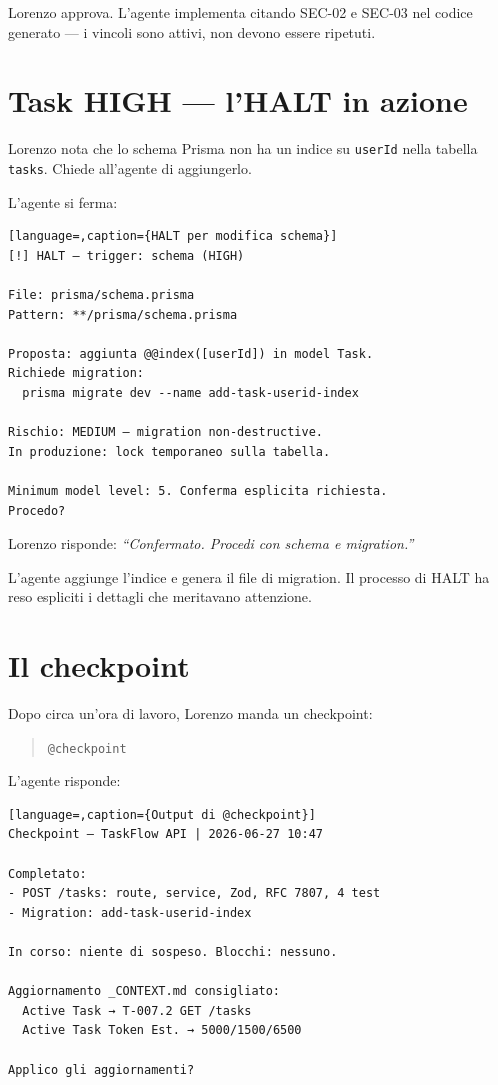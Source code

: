 Lorenzo approva. L'agente implementa citando SEC-02 e SEC-03 nel codice generato --- i vincoli sono attivi, non devono essere ripetuti.

\section{Task HIGH --- l'HALT in azione}
\label{sec:03-task-high}

Lorenzo nota che lo schema Prisma non ha un indice su \texttt{userId} nella tabella \texttt{tasks}. Chiede all'agente di aggiungerlo.

L'agente si ferma:

\begin{lstlisting}[language=,caption={HALT per modifica schema}]
[!] HALT — trigger: schema (HIGH)

File: prisma/schema.prisma
Pattern: **/prisma/schema.prisma

Proposta: aggiunta @@index([userId]) in model Task.
Richiede migration:
  prisma migrate dev --name add-task-userid-index

Rischio: MEDIUM — migration non-destructive.
In produzione: lock temporaneo sulla tabella.

Minimum model level: 5. Conferma esplicita richiesta.
Procedo?
\end{lstlisting}

Lorenzo risponde: \textit{``Confermato. Procedi con schema e migration.''}

L'agente aggiunge l'indice e genera il file di migration. Il processo di HALT ha reso espliciti i dettagli che meritavano attenzione.

\section{Il checkpoint}
\label{sec:03-checkpoint}

Dopo circa un'ora di lavoro, Lorenzo manda un checkpoint:

\begin{quote}
\texttt{@checkpoint}
\end{quote}

L'agente risponde:

\begin{lstlisting}[language=,caption={Output di @checkpoint}]
Checkpoint — TaskFlow API | 2026-06-27 10:47

Completato:
- POST /tasks: route, service, Zod, RFC 7807, 4 test
- Migration: add-task-userid-index

In corso: niente di sospeso. Blocchi: nessuno.

Aggiornamento _CONTEXT.md consigliato:
  Active Task → T-007.2 GET /tasks
  Active Task Token Est. → 5000/1500/6500

Applico gli aggiornamenti?
\end{lstlisting}

